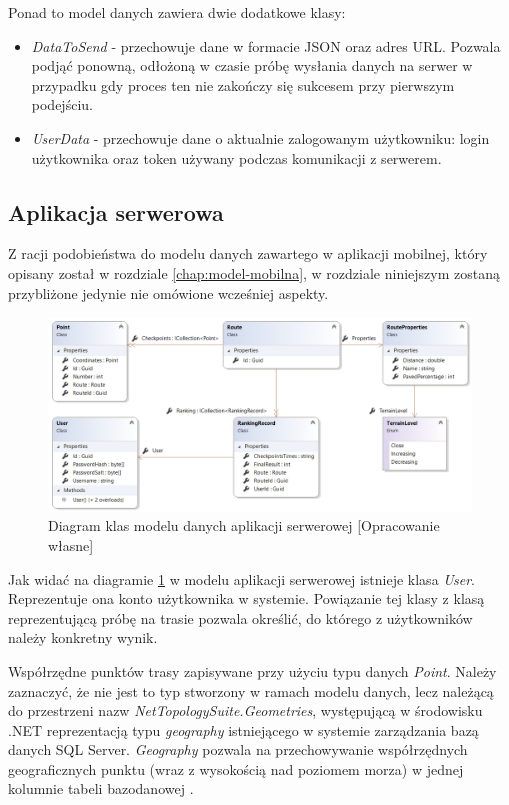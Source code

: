 Ponad to model danych zawiera dwie dodatkowe klasy:
\begin{itemize}
\item{\textit{DataToSend}} - przechowuje dane w formacie JSON oraz adres URL. Pozwala podjąć ponowną, odłożoną w czasie próbę wysłania danych na serwer w przypadku gdy proces ten nie zakończy się sukcesem przy pierwszym podejściu.
\item{\textit{UserData}} - przechowuje dane o aktualnie zalogowanym użytkowniku: login użytkownika oraz token używany podczas komunikacji z serwerem.
\end{itemize}
\subsection{Aplikacja serwerowa}
Z racji podobieństwa do modelu danych zawartego w aplikacji mobilnej, który opisany został w rozdziale \ref{chap:model-mobilna}, w rozdziale niniejszym zostaną przybliżone jedynie nie omówione wcześniej aspekty. 

\begin{figure}[h]\label{fig:api_model}
\begin{center}
\includegraphics[width=\textwidth]{img/api_model.png}
\caption{Diagram klas modelu danych aplikacji serwerowej [Opracowanie własne]}\label{image:api_model}
\end{center}
\end{figure}

Jak widać na diagramie \ref{image:api_model} w modelu aplikacji serwerowej istnieje klasa \textit{User}. Reprezentuje ona konto użytkownika w systemie. Powiązanie tej klasy z klasą reprezentującą próbę na trasie pozwala określić, do którego z użytkowników należy konkretny wynik.

Współrzędne punktów trasy zapisywane przy użyciu typu danych \textit{Point}. Należy zaznaczyć, że nie jest to typ stworzony w ramach modelu danych, lecz należącą do przestrzeni nazw \textit{NetTopologySuite.Geometries}, występującą w środowisku .NET reprezentacją typu \textit{geography} istniejącego w systemie zarządzania bazą danych SQL Server. \textit{Geography} pozwala na przechowywanie współrzędnych geograficznych punktu (wraz z wysokością nad poziomem morza) w jednej kolumnie tabeli bazodanowej \cite{geography-type}.

